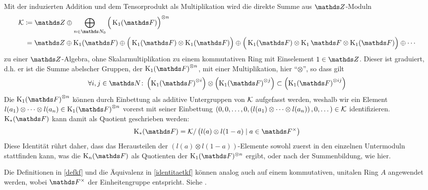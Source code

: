 \documentclass[ngerman,fontsize=11pt, paper=a4, parskip=half, titlepage=true, toc=bib]{scrartcl}
\begin{document}
\begin{Bem}\label{identitaetkf}
  Mit der induzierten Addition und dem Tensorprodukt als
  Multiplikation wird die direkte Summe aus $\Z$-Moduln
  \begin{align*}
    \calK &\coloneqq
            \Z\oplus\bigoplus_{n\in\N_0}{\Big(\K_1(\F)\Big)}^{\otimes n}\\
          &\,= \Z\oplus\K_1(\F)
            \oplus\Big(\K_1(\F)\otimes\K_1(\F)\Big)
            \oplus\Big(\K_1(\F)\otimes\K_1\F\otimes\K_1(\F)\Big)
            \oplus\dotsb
  \end{align*}
  zu einer $\Z$-Algebra, 
  ohne Skalarmultiplikation zu einem kommutativen Ring mit Einselement
  $1\in\Z$.
  Dieser ist graduiert, d.h. er ist die Summe abelscher Gruppen, 
  der ${\K_1(\F)}^{\otimes n}$, mit einer Multiplikation, hier
  \enquote{$\otimes$}, so dass gilt
  \begin{gather*}
    \forall i,j\in \N\colon 
    \left( {\K_1(\F)}^{\otimes i} \right) \otimes
    \left( {\K_1(\F)}^{\otimes j} \right)
    \subset \left( {\K_1(\F)}^{\otimes ij} \right)
  \end{gather*}
  Die ${\KoF}^{\otimes n}$ können durch Einbettung als additive 
  Untergruppen von $\mathcal{K}$ aufgefasst
  werden, weshalb wir ein Element
  $l(a_1)\otimes\dotsb\otimes l(a_n)\in {\KoF}^{\otimes n}$
  vorerst mit seiner Einbettung
  $\left(0,0,\dotsc,0,\left(l(a_1)\otimes\dotsb\otimes
      l(a_n)\right),0,\dotsc\right)\in\mathcal{K}$
  identifizieren.
  $\KF$ kann damit als Quotient geschrieben werden:
  \begin{gather*}
    \KF = \calK / \left(l(a)\otimes l(1-a)\mid a\in\Fx\right)
  \end{gather*}
  Diese Identität rührt daher, dass das Herausteilen 
  der $(l(a)\otimes l(1-a))$-Elemente sowohl zuerst in den einzelnen
  Untermoduln stattfinden kann, was die $\KnF$ als Quotienten der
  $\KoF^{\otimes n}$ ergibt, 
  oder nach der Summenbildung, wie hier.
\end{Bem}

\begin{Bem}
  Die Definitionen in \ref{defkf} und die Äquivalenz in 
  \ref{identitaetkf} können analog auch auf 
  einem kommutativen, unitalen Ring $A$ angewendet werden,
  wobei $\Fx$ der Einheitengruppe entspricht. Siehe \cite{kerzdipl,kerz}.
\end{Bem}
\end{document}
